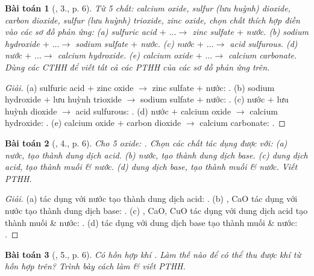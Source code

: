 \documentclass{article}
\newtheorem{baitoan}{Bài toán}
\begin{document}
\begin{baitoan}[\cite{SGK_Hoa_Hoc_9}, 3., p. 6]
	Từ 5 chất: calcium oxide, sulfur (lưu huỳnh) dioxide, carbon dioxide, sulfur (lưu huỳnh) trioxide, zinc oxide, chọn chất thích hợp điền vào các sơ đồ phản ứng: (a) sulfuric acid $+$ $\ldots\to$ zinc sulfate $+$ nước. (b) sodium hydroxide $+$ $\ldots\to$ sodium sulfate $+$ nước. (c) nước $+$ $\ldots\to$ acid sulfurous. (d) nước $+$ $\ldots\to$ calcium hydroxide. (e) calcium oxide $+$ $\ldots\to$ calcium carbonate. Dùng các {\rm CTHH} để viết tất cả các {\rm PTHH} của các sơ đồ phản ứng trên.
\end{baitoan}

\begin{proof}[Giải]
	(a) sulfuric acid $+$ zinc oxide $\to$ zinc sulfate $+$ nước: . (b) sodium hydroxide $+$ lưu huỳnh trioxide $\to$ sodium sulfate $+$ nước: . (c) nước $+$ lưu huỳnh dioxide $\to$ acid sulfurous: . (d) nước $+$ calcium oxide $\to$ calcium hydroxide: . (e) calcium oxide $+$ carbon dioxide $\to$ calcium carbonate: .
\end{proof}

\begin{baitoan}[\cite{SGK_Hoa_Hoc_9}, 4., p. 6]
	Cho 5 oxide: {\rm{}}. Chọn các chất tác dụng được với: (a) nước, tạo thành dung dịch acid. (b) nước, tạo thành dung dịch base. (c) dung dịch acid, tạo thành muối \& nước. (d) dung dịch base, tạo thành muối \& nước. Viết {\rm PTHH}.
\end{baitoan}

\begin{proof}[Giải]
	(a)  tác dụng với nước tạo thành dung dịch acid: . (b) , CaO tác dụng với nước tạo thành dung dịch base: . (c) , CaO, CuO tác dụng với dung dịch acid tạo thành muối \& nước: . (d)  tác dụng với dung dịch base tạo thành muối \& nước: .
\end{proof}

\begin{baitoan}[\cite{SGK_Hoa_Hoc_9}, 5., p. 6]
	Có hỗn hợp khí {\rm{}}. Làm thế nào để có thể thu được khí {\rm{}} từ hỗn hợp trên? Trình bày cách làm \& viết  {\rm PTHH}.
\end{baitoan}
\end{document}

